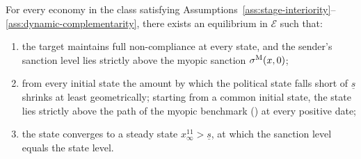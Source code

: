 \begin{theorem}
\label{thm:regime-separation}
For every economy in the class satisfying
Assumptions~\ref{ass:stage-interiority}--\ref{ass:dynamic-complementarity}, there
exists an equilibrium in $\mathcal E$ such that:
\begin{enumerate}[label=(\roman*)]
\item the target maintains full non-compliance at every state, and the sender's
sanction level lies strictly above the myopic sanction $\sigma^{\mathrm{M}}(x,0)$;
\item from every initial state the amount by which the political state falls short of
$\underline s$ shrinks at least geometrically; starting from a common initial state,
the state lies strictly above the path of the myopic benchmark
() at every positive date;
\item the state converges to a steady state $x^{11}_\infty>\underline s$, at which the
sanction level equals the state level.
\end{enumerate}
\end{theorem}

